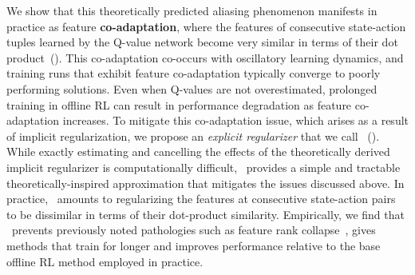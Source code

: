 We show that this theoretically predicted aliasing phenomenon manifests in practice as feature \textbf{co-adaptation}, where the features of consecutive state-action tuples learned by the Q-value network become very similar in terms of their dot product~(). This co-adaptation co-occurs with oscillatory learning dynamics, and training runs that exhibit feature co-adaptation typically converge to poorly performing solutions. Even when Q-values are not overestimated, prolonged training in offline RL can result in performance degradation as feature co-adaptation increases. 
To mitigate this co-adaptation issue, which arises as a result of implicit regularization, we propose an \emph{explicit regularizer} that we call \methodname~().
While exactly estimating and cancelling the effects of the theoretically derived implicit regularizer is computationally difficult, \methodname\ provides a simple and tractable theoretically-inspired approximation that mitigates the issues discussed above. In practice, \methodname\ amounts to regularizing the features at consecutive state-action pairs to be dissimilar in terms of their dot-product similarity. Empirically, we find that \methodname\ prevents previously noted pathologies such as feature rank collapse~\citep{kumar2021implicit},  gives methods that train for longer and improves performance relative to the base offline RL method employed in practice.

